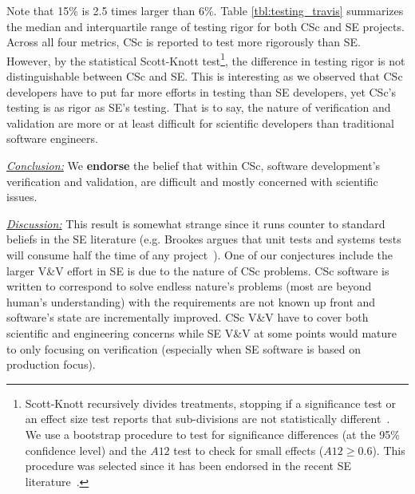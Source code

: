 \documentclass[conference,10pt]{IEEEtran}
\newcommand{\bi}{\begin{itemize}}
\newenvironment{RQ}{\vspace{1mm}\begin{tcolorbox}[enhanced,width=3.4in,size=fbox,colback=red!5!white,drop shadow southeast,sharp corners]}{\end{tcolorbox}}
\begin{document}
Note that  15\% is 2.5 times larger than 6\%. Table \ref{tbl:testing_travis} summarizes the median and interquartile range of testing rigor for both CSc and SE projects. Across all four metrics, CSc is reported to test more rigorously than SE. However, by the statistical Scott-Knott test\footnote{
Scott-Knott recursively divides treatments, stopping if
a significance test or an effect size test reports that sub-divisions are
not statistically different~\cite{mittas2013ranking, ghotra15}.
We use a bootstrap procedure to test for significance differences (at the 95\% confidence level) 
and the $\mathit{A12}$ test to check for small effects ($\mathit{A12} \ge 0.6$).
This procedure was selected
since it has been endorsed in the recent SE literature~\cite{mittas2013ranking,arcuri2011practical}.}, the difference in testing rigor is not distinguishable between CSc and SE. This is interesting as we observed that CSc developers have to put far more efforts in testing than SE developers, yet CSc's testing is as rigor as SE's testing. That is
to say, the nature of verification and validation are more or at least difficult for scientific developers than traditional software engineers.

\begin{RQ}
\textit{\underline{Conclusion:}}
We \textbf{endorse} the belief that within CSc, software development's verification and validation, are difficult and mostly concerned with scientific issues. 
\end{RQ} 


\noindent\textit{\underline{Discussion:}} This result is somewhat strange since it runs counter to standard beliefs in the SE literature (e.g. Brookes argues that unit tests and systems tests will consume half the time of any project~\cite{brooks1995mythical}). One of our conjectures include the larger V\&V effort in SE  is due to the nature of CSc problems. CSc software is written to correspond to solve endless nature's problems (most are beyond human's understanding) with the requirements are not known up front and software's state are incrementally improved. CSc V\&V have to cover both scientific and engineering concerns while SE V\&V at some points would mature to only focusing on verification (especially when SE software is based on production focus). 
\end{document}
